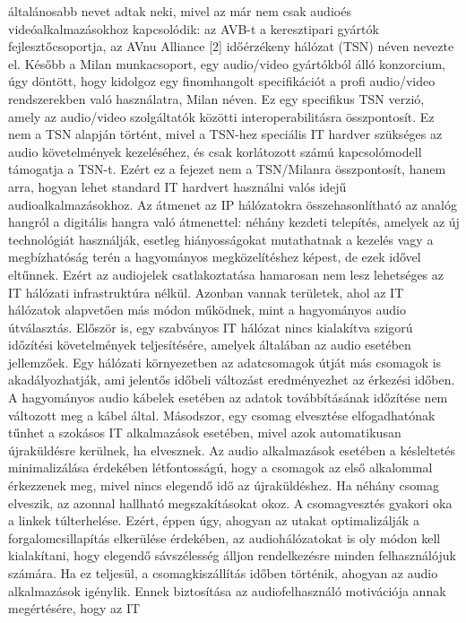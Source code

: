 általánosabb nevet adtak neki, mivel az már nem csak audioés
videóalkalmazásokhoz kapcsolódik: az AVB-t a keresztipari gyártók
fejlesztőcsoportja, az AVnu Alliance [2] időérzékeny hálózat (TSN) néven nevezte
el. Később a Milan munkacsoport, egy audio/video gyártókból álló konzorcium, úgy
döntött, hogy kidolgoz egy finomhangolt specifikációt a profi audio/video
rendszerekben való használatra, Milan néven. Ez egy specifikus TSN verzió, amely
az audio/video szolgáltatók közötti interoperabilitásra összpontosít. Ez nem a
TSN alapján történt, mivel a TSN-hez speciális IT hardver szükséges az audio
követelmények kezeléséhez, és csak korlátozott számú kapcsolómodell támogatja a
TSN-t. Ezért ez a fejezet nem a TSN/Milanra összpontosít, hanem arra, hogyan
lehet standard IT hardvert használni valós idejű audioalkalmazásokhoz.
Az átmenet az IP hálózatokra összehasonlítható az analóg hangról a digitális
hangra való átmenettel: néhány kezdeti telepítés, amelyek az új technológiát
használják, esetleg hiányosságokat mutathatnak a kezelés vagy a megbízhatóság
terén a hagyományos megközelítéshez képest, de ezek idővel eltűnnek. Ezért az
audiojelek csatlakoztatása hamarosan nem lesz lehetséges az IT hálózati
infrastruktúra nélkül. Azonban vannak területek, ahol az IT hálózatok alapvetően
más módon működnek, mint a hagyományos audio útválasztás. Először is, egy
szabványos IT hálózat nincs kialakítva szigorú időzítési követelmények
teljesítésére, amelyek általában az audio esetében jellemzőek. Egy hálózati
környezetben az adatcsomagok útját más csomagok is akadályozhatják, ami jelentős
időbeli változást eredményezhet az érkezési időben. A hagyományos audio kábelek
esetében az adatok továbbításának időzítése nem változott meg a kábel által.
Másodszor, egy csomag elvesztése elfogadhatónak tűnhet a szokásos IT
alkalmazások esetében, mivel azok automatikusan újraküldésre kerülnek, ha
elvesznek. Az audio alkalmazások esetében a késleltetés minimalizálása érdekében
létfontosságú, hogy a csomagok az első alkalommal érkezzenek meg, mivel nincs
elegendő idő az újraküldéshez. Ha néhány csomag elveszik, az azonnal hallható
megszakításokat okoz. A csomagvesztés gyakori oka a linkek túlterhelése. Ezért,
éppen úgy, ahogyan az utakat optimalizálják a forgalomcsillapítás elkerülése
érdekében, az audiohálózatokat is oly módon kell kialakítani, hogy elegendő
sávszélesség álljon rendelkezésre minden felhasználójuk számára. Ha ez teljesül,
a csomagkiszállítás időben történik, ahogyan az audio alkalmazások igénylik.
Ennek biztosítása az audiofelhasználó motivációja annak megértésére, hogy az IT
